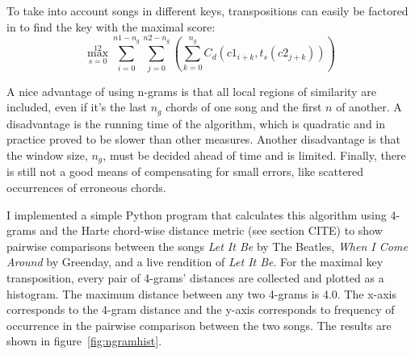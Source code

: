 
To take into account songs in different keys, transpositions can easily be factored in to find the key with the maximal score: \[\max_{s=0}^{12} \sum_{i=0}^{n1 - n_g} \sum_{j=0}^{n2 - n_g} \left( \sum_{k=0}^{n_g} C_d({c1}_{i+k}, t_s({c2}_{j+k})) \right) \]

A nice advantage of using n-grams is that all local regions of similarity are included, even if it's the last $n_g$ chords of one song and the first $n$ of another. A disadvantage is the running time of the algorithm, which is quadratic and in practice proved to be slower than other measures. Another disadvantage is that the window size, $n_g$, must be decided ahead of time and is limited. Finally, there is still not a good means of compensating for small errors, like scattered occurrences of erroneous chords.

I implemented a simple Python program that calculates this algorithm using 4-grams and the Harte chord-wise distance metric (see section CITE) to show pairwise comparisons between the songs \textit{Let It Be} by The Beatles, \textit{When I Come Around} by Greenday, and a live rendition of \textit{Let It Be}. For the maximal key transposition, every pair of 4-grams' distances are collected and plotted as a histogram. The maximum distance between any two 4-grams is 4.0. The x-axis corresponds to the 4-gram distance and the y-axis corresponds to frequency of occurrence in the pairwise comparison between the two songs. The results are shown in figure~\ref{fig:ngramhist}.